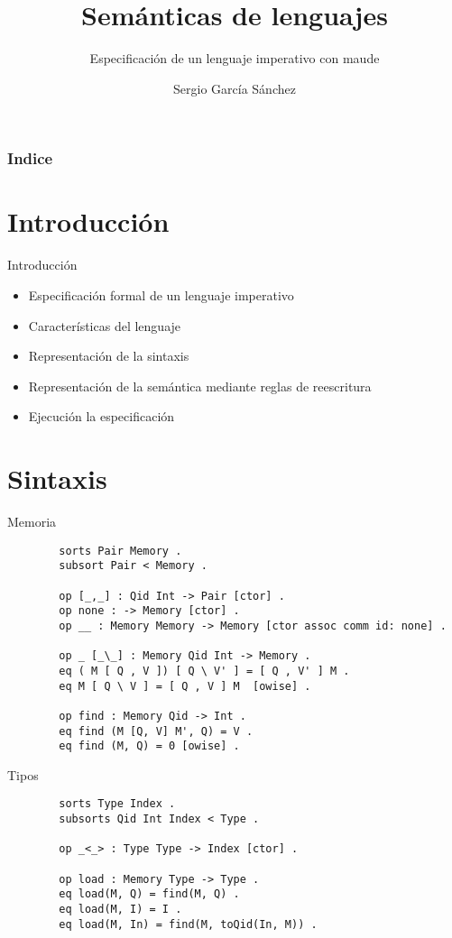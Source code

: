 \documentclass{beamer}
\title{Semánticas de lenguajes}
\subtitle{Especificación de un lenguaje imperativo con maude}
\author{Sergio García Sánchez}
\institute{UCM}
\date{\mydate}
\begin{document}
    \begin{frame}
        \titlepage
    \end{frame}

    \begin{frame}
        \frametitle{Indice}
        \tableofcontents
    \end{frame}


    \section{Introducción}
    \begin{frame}{Introducción}
        \begin{itemize}
            \item Especificación formal de un lenguaje imperativo
            \item Características del lenguaje
            \item Representación de la sintaxis
            \item Representación de la semántica mediante reglas de reescritura
            \item Ejecución la especificación
        \end{itemize}
    \end{frame}

    \section{Sintaxis}
    \begin{frame}[fragile]{Memoria}
        \begin{verbatim}
        sorts Pair Memory .
        subsort Pair < Memory .
    
        op [_,_] : Qid Int -> Pair [ctor] .
        op none : -> Memory [ctor] .
        op __ : Memory Memory -> Memory [ctor assoc comm id: none] .

        op _ [_\_] : Memory Qid Int -> Memory .
        eq ( M [ Q , V ]) [ Q \ V' ] = [ Q , V' ] M .
        eq M [ Q \ V ] = [ Q , V ] M  [owise] .
        
        op find : Memory Qid -> Int .
        eq find (M [Q, V] M', Q) = V .
        eq find (M, Q) = 0 [owise] .
        \end{verbatim}
    \end{frame}

    \begin{frame}[fragile]{Tipos}
        \begin{verbatim}
        sorts Type Index .
        subsorts Qid Int Index < Type .

        op _<_> : Type Type -> Index [ctor] .

        op load : Memory Type -> Type .
        eq load(M, Q) = find(M, Q) .
        eq load(M, I) = I .
        eq load(M, In) = find(M, toQid(In, M)) .
        \end{verbatim}
    \end{frame}
\end{document}
